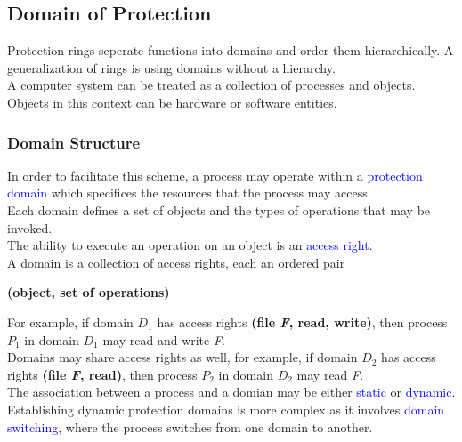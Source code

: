 \documentclass{book/custombook}
\begin{document}
            \subsection{Domain of Protection}
                Protection rings seperate functions into domains and order them hierarchically. A generalization of rings is using 
                domains without a hierarchy.\\
                A computer system can be treated as a collection of processes and objects.\\
                Objects in this context can be hardware or software entities.\\
                \subsubsection{Domain Structure}
                    In order to facilitate this scheme, a process may operate within a \textcolor{blue}{protection domain} which 
                    specifices the resources that the process may access.\\
                    Each domain defines a set of objects and the types of operations that may be invoked.\\
                    The ability to execute an operation on an object is an \textcolor{blue}{access right}.\\
                    A domain is a collection of access rights, each an ordered pair
                    \begin{center}
                        \textbf{(object, set of operations)}
                    \end{center}
                    For example, if domain $D_1$ has access rights \textbf{(file \textit{F}, read, write)}, then process $P_1$ in domain $D_1$
                    may read and write \textit{F}.\\
                    Domains may share access rights as well, for example, if domain $D_2$ has access rights \textbf{(file \textit{F}, read)},
                    then process $P_2$ in domain $D_2$ may read \textit{F}.\\ 
                    The association between a process and a domian may be either \textcolor{blue}{static} or \textcolor{blue}{dynamic}.\\
                    Establishing dynamic protection domains is more complex as it involves \textcolor{blue}{domain switching}, where 
                    the process switches from one domain to another.\\
\end{document}
